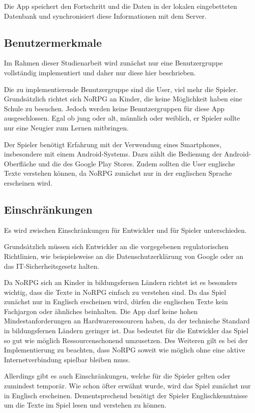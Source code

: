 		Die App speichert den Fortschritt und die Daten in der lokalen eingebetteten Datenbank und synchronisiert diese Informationen mit dem Server.
	
	\subsection{Benutzermerkmale}
		Im Rahmen dieser Studienarbeit wird zunächst nur eine Benutzergruppe vollständig implementiert und daher nur diese hier beschrieben.
		
		Die zu implementierende Benutzergruppe sind die User, viel mehr die Spieler. Grundsätzlich richtet sich NoRPG an Kinder, die keine Möglichkeit haben eine Schule zu besuchen. Jedoch werden keine Benutzergruppen für diese App ausgeschlossen. Egal ob jung oder alt, männlich oder weiblich, er Spieler sollte nur eine Neugier zum Lernen mitbringen. 
		
		Der Spieler benötigt Erfahrung mit der Verwendung eines Smartphones, insbesondere mit einem Android-Systems. Dazu zählt die Bedienung der Android-Oberfläche und die des Google Play Stores. Zudem sollten die User englische Texte verstehen können, da NoRPG zunächst nur in der englischen Sprache erscheinen wird.
			
	\subsection{Einschränkungen}
		Es wird zwischen Einschränkungen für Entwickler und für Spieler unterschieden.
		
		Grundsätzlich müssen sich Entwickler an die vorgegebenen regulatorischen Richtlinien, wie beispielsweise an die Datenschutzerklärung von Google oder an das IT-Sicherheitsgesetz halten.
		
		Da NoRPG sich an Kinder in bildungsfernen Ländern richtet ist es besonders wichtig, dass die Texte in NoRPG einfach zu verstehen sind. Da das Spiel zunächst nur in Englisch erscheinen wird, dürfen die englischen Texte kein Fachjargon oder ähnliches beinhalten. Die App darf keine hohen Mindestanforderungen an Hardwareressourcen haben, da der technische Standard in bildungsfernen Ländern geringer ist. Das bedeutet für die Entwickler das Spiel so gut wie möglich Ressourcenschonend umzusetzen. Des Weiteren gilt es bei der Implementierung zu beachten, dass NoRPG soweit wie möglich ohne eine aktive Internetverbindung spielbar bleiben muss.
		
		Allerdings gibt es auch Einschränkungen, welche für die Spieler gelten oder zumindest temporär. Wie schon öfter erwähnt wurde, wird das Spiel zunächst nur in Englisch erscheinen. Dementsprechend benötigt der Spieler Englischkenntnisse um die Texte im Spiel lesen und verstehen zu können.
		
